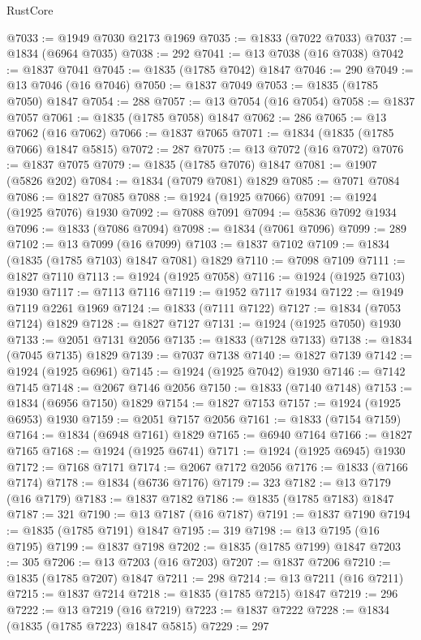 \begin{lexlean}{RustCore}
\begin{coremodule}
@7033 := @1949 @7030 @2173 @1969
@7035 := @1833 (@7022 @7033)
@7037 := @1834 (@6964 @7035)
@7038 := 292
@7041 := @13 @7038 (@16 @7038)
@7042 := @1837 @7041
@7045 := @1835 (@1785 @7042) @1847
@7046 := 290
@7049 := @13 @7046 (@16 @7046)
@7050 := @1837 @7049
@7053 := @1835 (@1785 @7050) @1847
@7054 := 288
@7057 := @13 @7054 (@16 @7054)
@7058 := @1837 @7057
@7061 := @1835 (@1785 @7058) @1847
@7062 := 286
@7065 := @13 @7062 (@16 @7062)
@7066 := @1837 @7065
@7071 := @1834 (@1835 (@1785 @7066) @1847 @5815)
@7072 := 287
@7075 := @13 @7072 (@16 @7072)
@7076 := @1837 @7075
@7079 := @1835 (@1785 @7076) @1847
@7081 := @1907 (@5826 @202)
@7084 := @1834 (@7079 @7081) @1829
@7085 := @7071 @7084
@7086 := @1827 @7085
@7088 := @1924 (@1925 @7066)
@7091 := @1924 (@1925 @7076) @1930
@7092 := @7088 @7091
@7094 := @5836 @7092 @1934
@7096 := @1833 (@7086 @7094)
@7098 := @1834 (@7061 @7096)
@7099 := 289
@7102 := @13 @7099 (@16 @7099)
@7103 := @1837 @7102
@7109 := @1834 (@1835 (@1785 @7103) @1847 @7081) @1829
@7110 := @7098 @7109
@7111 := @1827 @7110
@7113 := @1924 (@1925 @7058)
@7116 := @1924 (@1925 @7103) @1930
@7117 := @7113 @7116
@7119 := @1952 @7117 @1934
@7122 := @1949 @7119 @2261 @1969
@7124 := @1833 (@7111 @7122)
@7127 := @1834 (@7053 @7124) @1829
@7128 := @1827 @7127
@7131 := @1924 (@1925 @7050) @1930
@7133 := @2051 @7131 @2056
@7135 := @1833 (@7128 @7133)
@7138 := @1834 (@7045 @7135) @1829
@7139 := @7037 @7138
@7140 := @1827 @7139
@7142 := @1924 (@1925 @6961)
@7145 := @1924 (@1925 @7042) @1930
@7146 := @7142 @7145
@7148 := @2067 @7146 @2056
@7150 := @1833 (@7140 @7148)
@7153 := @1834 (@6956 @7150) @1829
@7154 := @1827 @7153
@7157 := @1924 (@1925 @6953) @1930
@7159 := @2051 @7157 @2056
@7161 := @1833 (@7154 @7159)
@7164 := @1834 (@6948 @7161) @1829
@7165 := @6940 @7164
@7166 := @1827 @7165
@7168 := @1924 (@1925 @6741)
@7171 := @1924 (@1925 @6945) @1930
@7172 := @7168 @7171
@7174 := @2067 @7172 @2056
@7176 := @1833 (@7166 @7174)
@7178 := @1834 (@6736 @7176)
@7179 := 323
@7182 := @13 @7179 (@16 @7179)
@7183 := @1837 @7182
@7186 := @1835 (@1785 @7183) @1847
@7187 := 321
@7190 := @13 @7187 (@16 @7187)
@7191 := @1837 @7190
@7194 := @1835 (@1785 @7191) @1847
@7195 := 319
@7198 := @13 @7195 (@16 @7195)
@7199 := @1837 @7198
@7202 := @1835 (@1785 @7199) @1847
@7203 := 305
@7206 := @13 @7203 (@16 @7203)
@7207 := @1837 @7206
@7210 := @1835 (@1785 @7207) @1847
@7211 := 298
@7214 := @13 @7211 (@16 @7211)
@7215 := @1837 @7214
@7218 := @1835 (@1785 @7215) @1847
@7219 := 296
@7222 := @13 @7219 (@16 @7219)
@7223 := @1837 @7222
@7228 := @1834 (@1835 (@1785 @7223) @1847 @5815)
@7229 := 297

\end{coremodule}
\end{lexlean}
